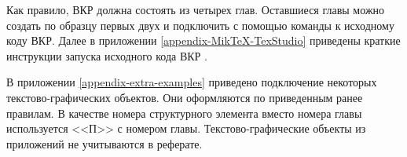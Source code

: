 Как правило, ВКР должна состоять из четырех глав. Оставшиеся главы можно создать по образцу первых двух и подключить с помощью команды \verb|| к исходному коду ВКР. Далее в приложении \ref{appendix-MikTeX-TexStudio} приведены краткие инструкции запуска исходного кода ВКР \cite{latex-miktex,latex-texstudio}.

В приложении \ref{appendix-extra-examples} приведено подключение некоторых текстово-графических объектов. Они оформляются по приведенным ранее правилам. В качестве номера структурного элемента вместо номера главы используется <<П>> с номером главы. Текстово-графические объекты из приложений не учитываются в реферате.



%
